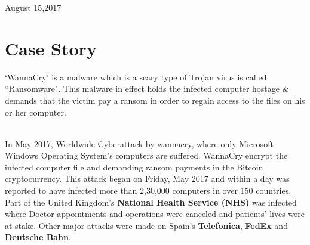 \documentclass[a4paper,10pt]{article}
\begin{document}
\begin{titlepage}
	\vspace{0.5\baselineskip} %
	
	\textit{ } %
	
	\vfill %
	
	
	
	\vspace{0.3\baselineskip} %
	
	
	{\large August 15,2017} %
\end{titlepage}





\newpage
{}
\tableofcontents
\newpage



\section{Case Story}
`WannaCry' is a malware which is a scary type of Trojan virus is called ``Ransomware". 
This malware in effect holds the infected computer hostage & demands that the victim 
pay a ransom in order to regain access to the files on his or her computer.

\\
In May 2017, Worldwide Cyberattack by wannacry, where only Microsoft Windows Operating
System's computers are suffered. WannaCry encrypt the infected computer file and demanding
ransom payments in the Bitcoin cryptocurrency. This attack began on Friday, May 2017 and  
within a day was reported to have infected more than 2,30,000 computers in over 150 countries.
Part of the United Kingdom’s {\bf National Health Service (NHS)} was infected where Doctor
appointments and operations were canceled and patients’ lives were at stake. Other major attacks were made on Spain’s
{\bf Telefonica}, {\bf FedEx} and {\bf Deutsche Bahn}.
\end{document}
